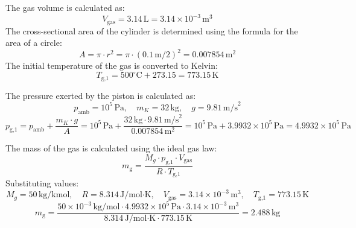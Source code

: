 The gas volume is calculated as:  
\[
V_{\text{gas}} = 3.14 \, \text{L} = 3.14 \times 10^{-3} \, \text{m}^3
\]  
The cross-sectional area of the cylinder is determined using the formula for the area of a circle:  
\[
A = \pi \cdot r^2 = \pi \cdot \left(0.1 \, \text{m} / 2\right)^2 = 0.007854 \, \text{m}^2
\]  
The initial temperature of the gas is converted to Kelvin:  
\[
T_{\text{g,1}} = 500^\circ\text{C} + 273.15 = 773.15 \, \text{K}
\]  

The pressure exerted by the piston is calculated as:  
\[
p_{\text{amb}} = 10^5 \, \text{Pa}, \quad m_K = 32 \, \text{kg}, \quad g = 9.81 \, \text{m/s}^2
\]  
\[
p_{\text{g,1}} = p_{\text{amb}} + \frac{m_K \cdot g}{A} = 10^5 \, \text{Pa} + \frac{32 \, \text{kg} \cdot 9.81 \, \text{m/s}^2}{0.007854 \, \text{m}^2} = 10^5 \, \text{Pa} + 3.9932 \times 10^5 \, \text{Pa} = 4.9932 \times 10^5 \, \text{Pa}
\]  

The mass of the gas is calculated using the ideal gas law:  
\[
m_{\text{g}} = \frac{M_g \cdot p_{\text{g,1}} \cdot V_{\text{gas}}}{R \cdot T_{\text{g,1}}}
\]  
Substituting values:  
\[
M_g = 50 \, \text{kg/kmol}, \quad R = 8.314 \, \text{J/mol·K}, \quad V_{\text{gas}} = 3.14 \times 10^{-3} \, \text{m}^3, \quad T_{\text{g,1}} = 773.15 \, \text{K}
\]  
\[
m_{\text{g}} = \frac{50 \times 10^{-3} \, \text{kg/mol} \cdot 4.9932 \times 10^5 \, \text{Pa} \cdot 3.14 \times 10^{-3} \, \text{m}^3}{8.314 \, \text{J/mol·K} \cdot 773.15 \, \text{K}} = 2.488 \, \text{kg}
\]